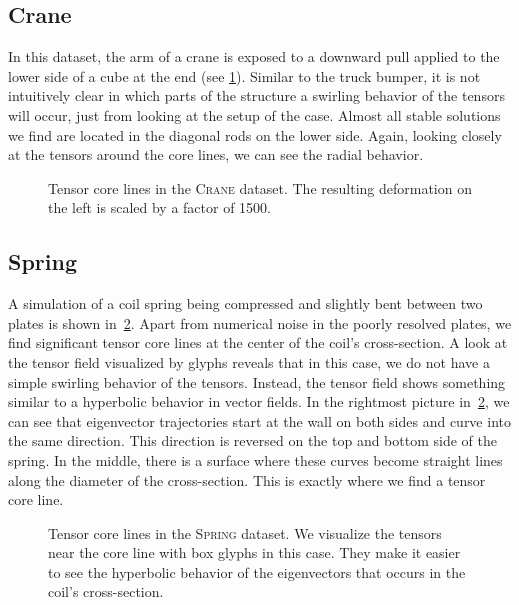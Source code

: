 \subsection{Crane} %
\label{sub:crane}
%
In this dataset, the arm of a crane is exposed to a downward pull applied to
the lower side of a cube at the end (see \cref{fig:crane}).
%
Similar to the truck bumper, it is not intuitively clear in which parts of the
structure a swirling behavior of the tensors will occur, just from looking at
the setup of the case.
%
Almost all stable solutions we find are located in the diagonal rods on the
lower side.
%
Again, looking closely at the tensors around the core lines, we can see the
radial behavior.
%
\begin{figure}[p]
    \centering
    \setlength\figurewidth\linewidth
    
    \vspace*{-7mm}
    \caption{Tensor core lines in the \textsc{Crane} dataset. The resulting
             deformation on the left is scaled by a factor of
             \num{1500}.}
    \label{fig:crane}
\end{figure}
%
%
\subsection{Spring} %
\label{sub:spring}
%
A simulation of a coil spring being compressed and slightly bent between two
plates is shown in~\cref{fig:spring}.
%
Apart from numerical noise in the poorly resolved plates, we find significant
tensor core lines at the center of the coil's cross-section.
%
A look at the tensor field visualized by glyphs reveals that in this case, we
do not have a simple swirling behavior of the tensors.
%
Instead, the tensor field shows something similar to a hyperbolic behavior in
vector fields.
%
In the rightmost picture in~\cref{fig:spring}, we can see that eigenvector
trajectories start at the wall on both sides and curve into the same direction.
%
This direction is reversed on the top and bottom side of the spring.
%
In the middle, there is a surface where these curves become straight lines along
the diameter of the cross-section.
%
This is exactly where we find a tensor core line.
%
\begin{figure}[p]
    \centering
    \setlength\figurewidth\linewidth
    
    \vspace*{-5mm}
    \caption{Tensor core lines in the \textsc{Spring} dataset. We visualize the
             tensors near the core line with box glyphs in this case. They make
             it easier to see the hyperbolic behavior of the eigenvectors that
             occurs in the coil's cross-section. }
    \label{fig:spring}
\end{figure}
%
%
